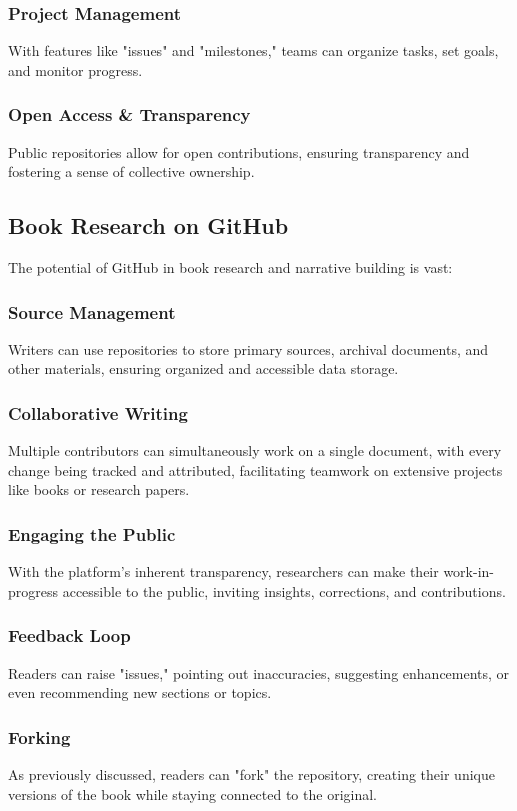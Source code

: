 \documentclass{book}
\begin{document}
\subsubsection*{Project Management}
With features like "issues" and "milestones," teams can organize tasks, set goals, and monitor progress.

\subsubsection*{Open Access \& Transparency}
Public repositories allow for open contributions, ensuring transparency and fostering a sense of collective ownership.

\subsection*{Book Research on GitHub}
The potential of GitHub in book research and narrative building is vast:

\subsubsection*{Source Management}
Writers can use repositories to store primary sources, archival documents, and other materials, ensuring organized and accessible data storage.

\subsubsection*{Collaborative Writing}
Multiple contributors can simultaneously work on a single document, with every change being tracked and attributed, facilitating teamwork on extensive projects like books or research papers.

\subsubsection*{Engaging the Public}
With the platform's inherent transparency, researchers can make their work-in-progress accessible to the public, inviting insights, corrections, and contributions.

\subsubsection*{Feedback Loop}
Readers can raise "issues," pointing out inaccuracies, suggesting enhancements, or even recommending new sections or topics.

\subsubsection*{Forking}
As previously discussed, readers can "fork" the repository, creating their unique versions of the book while staying connected to the original.
\end{document}
